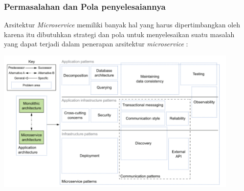\subsubsection{Permasalahan dan Pola penyelesaiannya}
Arsitektur \textit{Microservice} memiliki banyak hal yang harus dipertimbangkan oleh karena itu dibutuhkan strategi dan pola untuk menyelesaikan suatu masalah yang dapat terjadi dalam penerapan arsitektur \textit{microservice} \cite{1C7}:
\begin{center}
	\includegraphics[width=12cm]{img/PolaMicroservice.png}
	\label{fig:msa}
\end{center}
